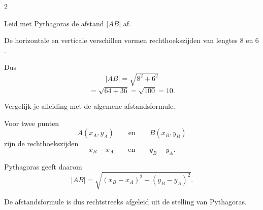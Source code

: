 \documentclass{ximera}
\begin{document}
\begin{oefening}{\oefU}
\begin{multicols}{2}
    
    \begin{question}
    Leid met Pythagoras de afstand $|AB|$ af.
    
    \begin{oplossing}
    De horizontale en verticale verschillen vormen rechthoekszijden van lengtes $8$ en $6$.
    
    Dus
    \[
    |AB|
    =\sqrt{8^2+6^2}
    \]
    \[
    =\sqrt{64+36}
    =\sqrt{100}
    =10.
    \]
    \end{oplossing}
    \end{question}
    
    
    \begin{question}
    Vergelijk je afleiding met de algemene afstandsformule.
    
    \begin{oplossing}
    Voor twee punten
    \[
    A(x_A,y_A)
    \qquad\text{en}\qquad
    B(x_B,y_B)
    \]
    zijn de rechthoekszijden
    \[
    x_B-x_A
    \qquad\text{en}\qquad
    y_B-y_A.
    \]
    
    Pythagoras geeft daarom
    \[
    |AB|
    =
    \sqrt{(x_B-x_A)^2+(y_B-y_A)^2}.
    \]
    
    De afstandsformule is dus rechtstreeks afgeleid uit de stelling van Pythagoras.
    \end{oplossing}
    \end{question}
    
    \end{multicols}
    
    \end{oefening}





    
\end{document}
